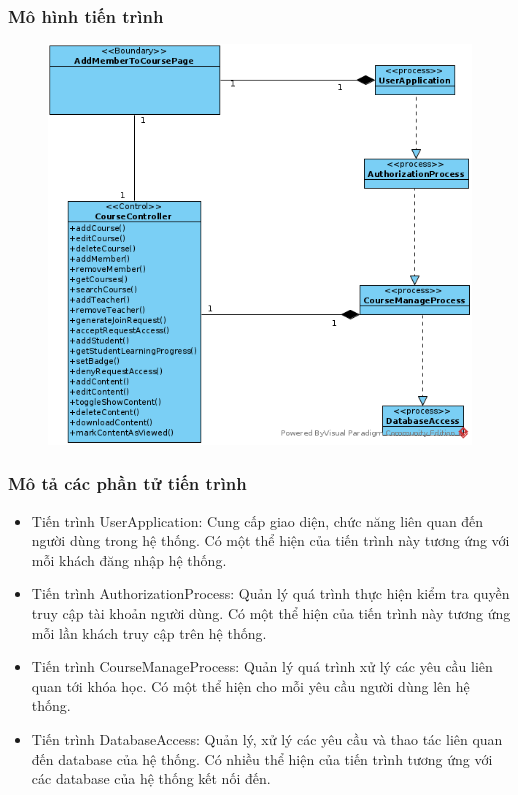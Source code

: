 \documentclass[./../main.tex]{subfiles}
\begin{document}
\subsubsection{Mô hình tiến trình}

\begin{figure}[H]
	\centering
	\includegraphics[width=\linewidth]{./images/pv_add_course_member.png}
\end{figure}

\subsubsection{Mô tả các phần tử tiến trình}
\begin{itemize}
	\item Tiến trình UserApplication: Cung cấp giao diện, chức năng liên quan đến người dùng trong hệ thống. Có một thể hiện của tiến trình này tương ứng với mỗi khách đăng nhập hệ thống.
	\item Tiến trình AuthorizationProcess: Quản lý quá trình thực hiện kiểm tra quyền truy cập tài khoản người dùng.
	Có một thể hiện của tiến trình này tương ứng mỗi lần khách truy cập trên hệ thống.
\item Tiến trình CourseManageProcess: Quản lý quá trình xử lý các yêu cầu liên quan tới khóa học.
	Có một thể hiện cho mỗi yêu cầu người dùng lên hệ thống.
	\item Tiến trình DatabaseAccess: Quản lý, xử lý các yêu cầu và thao tác liên quan đến database của hệ thống. Có nhiều thể hiện của tiến trình tương ứng với các database của hệ thống kết nối đến.
\end{itemize}
\end{document}
